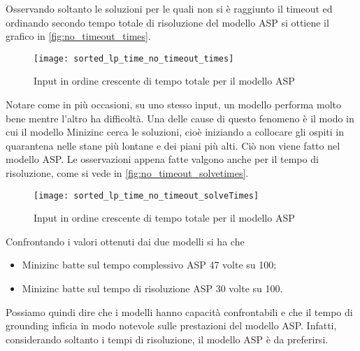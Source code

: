 \noindent
Osservando soltanto le soluzioni per le quali non si è raggiunto il timeout ed ordinando secondo tempo totale di risoluzione del modello ASP si ottiene il grafico in \autoref{fig:no_timeout_times}.
\begin{figure}[ht]
  \centering
  \texttt{[image: sorted\_lp\_time\_no\_timeout\_times]}
  \caption{Input in ordine crescente di tempo totale per il modello ASP}
  \label{fig:no_timeout_times}
\end{figure}
Notare come in più occasioni, su uno stesso input, un modello performa molto bene mentre l'altro ha difficoltà.
Una delle cause di questo fenomeno è il modo in cui il modello Minizinc cerca le soluzioni, cioè iniziando a collocare gli ospiti in quarantena nelle stane più lontane e dei piani più alti.
Ciò non viene fatto nel modello ASP.
Le osservazioni appena fatte valgono anche per il tempo di risoluzione, come si vede in \autoref{fig:no_timeout_solvetimes}.
\begin{figure}[ht]
  \centering
  \texttt{[image: sorted\_lp\_time\_no\_timeout\_solveTimes]}
  \caption{Input in ordine crescente di tempo totale per il modello ASP}
  \label{fig:no_timeout_solvetimes}
\end{figure}

\noindent
Confrontando i valori ottenuti dai due modelli si ha che
\begin{itemize}
  \item Minizinc batte sul tempo complessivo ASP 47 volte su 100;
  \item Minizinc batte sul tempo di risoluzione ASP 30 volte su 100.
\end{itemize}
Possiamo quindi dire che i modelli hanno capacità confrontabili e che il tempo di grounding inficia in modo notevole sulle prestazioni del modello ASP.
Infatti, considerando soltanto i tempi di risoluzione, il modello ASP è da preferirsi.
